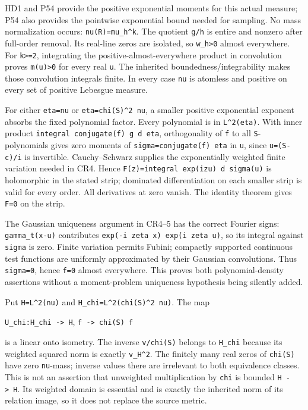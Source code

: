 HD1 and P54 provide the positive exponential moments for this actual measure; P54 also provides the pointwise exponential bound needed for sampling. No mass normalization occurs: \texttt{nu(R)=mu\_h\^{}k}. The quotient \texttt{g/h} is entire and nonzero after full-order removal. Its real-line zeros are isolated, so \texttt{w\_h\textgreater{}0} almost everywhere. For \texttt{k\textgreater{}=2}, integrating the positive-almost-everywhere product in convolution proves \texttt{m(u)\textgreater{}0} for every real \texttt{u}. The inherited boundedness/integrability makes those convolution integrals finite. In every case \texttt{nu} is atomless and positive on every set of positive Lebesgue measure.

For either \texttt{eta=nu} or \texttt{eta=\textbar{}chi(S)\textbar{}\^{}2\ nu}, a smaller positive exponential exponent absorbs the fixed polynomial factor. Every polynomial is in \texttt{L\^{}2(eta)}. With inner product \texttt{integral\ conjugate(f)\ g\ d\ eta}, orthogonality of \texttt{f} to all \texttt{S}-polynomials gives zero moments of \texttt{sigma=conjugate(f)\ eta} in \texttt{u}, since \texttt{u=(S-c)/i} is invertible. Cauchy--Schwarz supplies the exponentially weighted finite variation needed in CR4. Hence \texttt{F(z)=integral\ exp(izu)\ d\ sigma(u)} is holomorphic in the stated strip; dominated differentiation on each smaller strip is valid for every order. All derivatives at zero vanish. The identity theorem gives \texttt{F=0} on the strip.

The Gaussian uniqueness argument in CR4--5 has the correct Fourier signs: \texttt{gamma\_t(x-u)} contributes \texttt{exp(-i\ zeta\ x)\ exp(i\ zeta\ u)}, so its integral against \texttt{sigma} is zero. Finite variation permits Fubini; compactly supported continuous test functions are uniformly approximated by their Gaussian convolutions. Thus \texttt{sigma=0}, hence \texttt{f=0} almost everywhere. This proves both polynomial-density assertions without a moment-problem uniqueness hypothesis being silently added.

Put \texttt{H=L\^{}2(nu)} and \texttt{H\_chi=L\^{}2(\textbar{}chi(S)\textbar{}\^{}2\ nu)}. The map

\texttt{U\_chi:H\_chi\ -\textgreater{}\ H}, \texttt{f\ -\textgreater{}\ chi(S)\ f}

is a linear onto isometry. The inverse \texttt{v/chi(S)} belongs to \texttt{H\_chi} because its weighted squared norm is exactly \texttt{\textbar{}\textbar{}v\textbar{}\textbar{}\_H\^{}2}. The finitely many real zeros of \texttt{chi(S)} have zero \texttt{nu}-mass; inverse values there are irrelevant to both equivalence classes. This is not an assertion that unweighted multiplication by \texttt{chi} is bounded \texttt{H\ -\textgreater{}\ H}. Its weighted domain is essential and is exactly the inherited norm of its relation image, so it does not replace the source metric.

